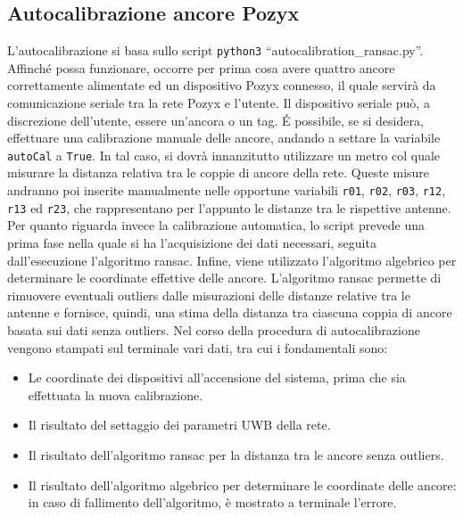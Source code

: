 \subsection{Autocalibrazione ancore Pozyx}
\label{sez:Autocalibrazione}
L'autocalibrazione si basa sullo script \texttt{python3} ``autocalibration\_ransac.py''. 
Affinché possa funzionare, occorre per prima cosa avere quattro ancore correttamente alimentate ed un dispositivo Pozyx connesso, il quale servirà da comunicazione 
seriale tra la rete Pozyx e l’utente. 
Il dispositivo seriale può, a discrezione dell’utente, essere un’ancora o un tag. 
É possibile, se si desidera, effettuare una calibrazione manuale delle ancore, andando a settare la variabile \verb|autoCal| a \verb|True|. 
In tal caso, si dovrà innanzitutto utilizzare un metro col quale misurare la distanza relativa tra le coppie di ancore della rete. Queste misure andranno poi 
inserite manualmente  nelle opportune variabili \texttt{r01}, \texttt{r02}, \texttt{r03}, \texttt{r12}, \texttt{r13} ed \texttt{r23}, che rappresentano per l'appunto 
le distanze tra le rispettive antenne.
Per quanto riguarda invece la calibrazione automatica, lo script prevede una prima fase nella quale si ha l'acquisizione dei dati necessari, seguita dall'esecuzione 
l’algoritmo ransac. Infine, viene utilizzato l’algoritmo algebrico per determinare le coordinate effettive delle ancore. 
L’algoritmo ransac permette di rimuovere eventuali outliers dalle misurazioni delle distanze relative tra le antenne e fornisce, quindi, una stima della distanza 
tra ciascuna coppia di ancore basata sui dati senza outliers.
Nel corso della procedura di autocalibrazione vengono stampati sul terminale vari dati, tra cui i fondamentali sono:
\begin{itemize}
	\item Le coordinate dei dispositivi all’accensione del sistema, prima che sia effettuata la nuova calibrazione.
	
	\item Il risultato del settaggio dei parametri UWB della rete.
	
	\item Il risultato dell’algoritmo ransac per la distanza tra le ancore senza outliers.
	
	\item Il risultato dell'algoritmo algebrico per determinare le coordinate delle ancore: in caso di fallimento dell'algoritmo, è mostrato a terminale l'errore.
\end{itemize}

